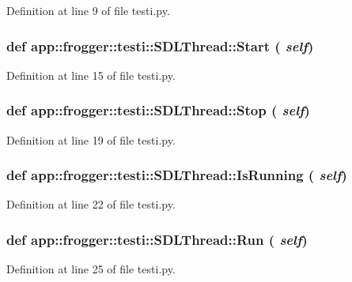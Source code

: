 Definition at line 9 of file testi.py.
\subsubsection{\setlength{\rightskip}{0pt plus 5cm}def app::frogger::testi::SDLThread::Start ( {\em self})}\label{classapp_1_1frogger_1_1testi_1_1SDLThread_8bc743b820daa108d0f299a39b882a9a}




Definition at line 15 of file testi.py.
\subsubsection{\setlength{\rightskip}{0pt plus 5cm}def app::frogger::testi::SDLThread::Stop ( {\em self})}\label{classapp_1_1frogger_1_1testi_1_1SDLThread_b8e69de546657c31dde4ae9639e053e2}




Definition at line 19 of file testi.py.
\subsubsection{\setlength{\rightskip}{0pt plus 5cm}def app::frogger::testi::SDLThread::IsRunning ( {\em self})}\label{classapp_1_1frogger_1_1testi_1_1SDLThread_b6f090f4a0eee6e0ad407e1281897fad}




Definition at line 22 of file testi.py.
\subsubsection{\setlength{\rightskip}{0pt plus 5cm}def app::frogger::testi::SDLThread::Run ( {\em self})}\label{classapp_1_1frogger_1_1testi_1_1SDLThread_a6e2326fe306539c37983535969c34a7}




Definition at line 25 of file testi.py.

